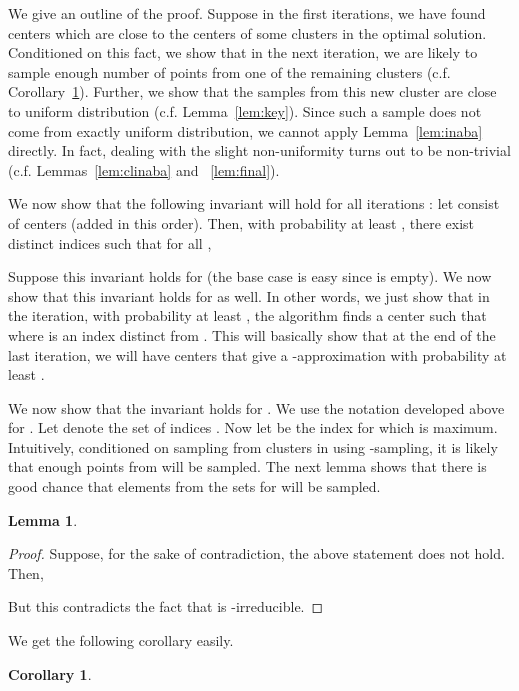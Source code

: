 \documentclass[a4paper]{article}
\newtheorem{lemma}[theorem]{Lemma}
\newtheorem{corollary}[theorem]{Corollary}
\begin{document}
We give an outline of the proof. Suppose in the first  iterations, we have found centers which are close to the centers of some 
 clusters in the optimal solution. Conditioned on this fact, we show that in the next iteration, we are likely to sample enough 
number of points from one of the remaining clusters (c.f. Corollary~\ref{cor:sample}). Further, we show that the samples from this new
cluster are close to uniform distribution (c.f. Lemma~\ref{lem:key}). Since such a sample does not come from exactly uniform distribution, we
cannot apply Lemma~\ref{lem:inaba} directly. In fact, dealing with the slight non-uniformity turns out to be non-trivial (c.f. Lemmas~\ref{lem:clinaba} and ~\ref{lem:final}). 

We now show that the following invariant will hold for all iterations  : let  consist of centers
 (added in this order). Then, with probability at least , there exist distinct
indices  such that
for all ,

Suppose this invariant holds for  (the base case is easy since  is empty).
We now show that this invariant holds for  as well. In other words, we just show that in the  iteration,
with probability at least ,  the
algorithm finds a center   such that
 where  is an index distinct from
.
This will basically show that at the end of the last iteration, we will have  centers that give a -approximation
with probability at least .


We now show that the invariant holds for . We use the notation developed above for . Let  denote
the set of indices . Now let  be the index  for which 
is maximum. Intuitively, conditioned on sampling from clusters in  using -sampling, it is  likely that
enough points from  will be sampled.
The next lemma shows that there is good chance that elements from the sets  for 
will be sampled.

\begin{lemma}
\label{lem:sampled}
 
\end{lemma}
\begin{proof}
Suppose, for the sake of contradiction, the above statement does not hold. Then,


But this contradicts the fact that  is -irreducible.
\end{proof}

\noindent
We get the following corollary easily.
\begin{corollary}
\label{cor:sample}

\end{corollary}
\end{document}
